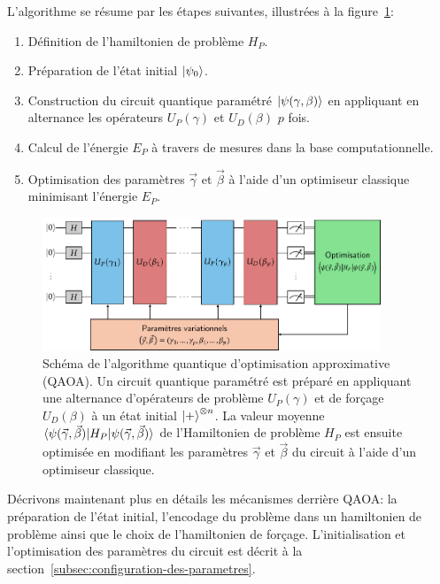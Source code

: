L'algorithme se résume par les étapes suivantes, illustrées à la figure~\ref{fig:qaoa}:

\begin{enumerate}[(1)]
    \item Définition de l'hamiltonien de problème $H_{P}$.
    \item Préparation de l'état initial $\ket{\psi_{0}}$.
    \item Construction du circuit quantique paramétré $\ket{\psi(\gamma, \beta)}$ en appliquant en alternance les opérateurs $U_{P}(\gamma)$ et $U_{D}(\beta)$ $p$ fois.
    \item Calcul de l'énergie $E_{P}$ à travers de mesures dans la base computationnelle.
    \item Optimisation des paramètres $\vec{\gamma}$ et $\vec{\beta}$ à l'aide d'un optimiseur classique minimisant l'énergie $E_{P}$.
\end{enumerate}

\begin{figure}[ht!]
    \centering
    \includegraphics[width=0.9\textwidth]{figures/qaoa.pdf}
    \caption[Algorithme quantique d'optimisation approximative]{Schéma de l'algorithme quantique d'optimisation approximative (QAOA). Un circuit quantique paramétré est préparé en appliquant une alternance d'opérateurs de problème $U_{P}(\gamma)$ et de forçage $U_{D}(\beta)$ à un état initial $\ket{+}^{\otimes n}$. La valeur moyenne $\braket{ \psi(\vec{\gamma}, \vec{\beta}) | H_{P} | \psi(\vec{\gamma}, \vec{\beta}) }$ de l'Hamiltonien de problème $H_{P}$ est ensuite optimisée en modifiant les paramètres $\vec{\gamma}$ et $\vec{\beta}$ du circuit à l'aide d'un optimiseur classique.}
    \label{fig:qaoa}
\end{figure}

Décrivons maintenant plus en détails les mécanismes derrière QAOA: la préparation de l'état initial, l'encodage du problème dans un hamiltonien de problème ainsi que le choix de l'hamiltonien de forçage. L'initialisation et l'optimisation des paramètres du circuit est décrit à la section~\ref{subsec:configuration-des-parametres}.

